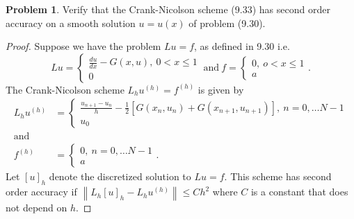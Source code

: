 \documentclass[12pt]{article}
\theoremstyle{definition}
\newtheorem{problem}{Problem}
\newcommand\norm[1]{\left\lVert#1\right\rVert}
\begin{document}
\begin{problem} Verify that the Crank-Nicolson scheme (9.33) has second order
  accuracy on a smooth solution $u=u(x)$ of problem (9.30).
\end{problem}

\begin{proof}
  Suppose we have the problem $Lu = f$, as defined in 9.30 i.e.
  \[
      Lu =
      \begin{cases}
        \frac{du}{dx} - G(x, u),\ 0 < x \leq 1 \\
        0
      \end{cases}
      \ \text{and} \
      f =
      \begin{cases}
        0,\ o < x \leq 1 \\
        a
      \end{cases}.
  \]
  The Crank-Nicolson scheme $L_hu^{(h)} = f^{(h)}$ is given by
  \begin{align*}
      L_hu^{(h)} &=
      \begin{cases}
        \frac{u_{n+1} - u_{n}}{h} - \frac{1}{2}[G(x_n, u_n) + G(x_{n+1}, u_{n+1})],\  n = 0, \dots N-1 \\
        u_0
      \end{cases}
      \\ \text{and} \\
      f^{(h)} &=
      \begin{cases}
        0,\  n = 0, \dots N-1 \\
        a
      \end{cases}.
  \end{align*}
  Let $[u]_h$ denote the discretized solution to $Lu = f$. This scheme has
  second order accuracy if $\norm{L_h[u]_h - L_hu^{(h)}} \leq C h^2$ where
  $C$ is a constant that does not depend on $h$.


\end{proof}
\end{document}
